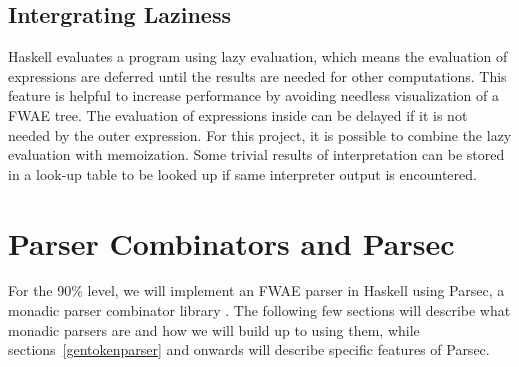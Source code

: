 \documentclass[format=acmlarge, review=false, nonacm=false, screen=true]{acmart}
\begin{document}
\subsection{Intergrating Laziness}
Haskell evaluates a program using lazy evaluation, which means the evaluation of expressions are deferred until the results are needed for other computations. This feature is helpful to increase performance by avoiding needless visualization of a FWAE tree. The evaluation of expressions inside can be delayed if it is not needed by the outer expression. For this project, it is possible to combine the lazy evaluation with memoization. Some trivial results of interpretation can be stored in a look-up table to be looked up if same interpreter output is encountered.

\section{Parser Combinators and Parsec}
For the 90\% level, we will implement an FWAE parser in Haskell using Parsec, a monadic parser combinator library \cite{parsec}. The following few sections will describe what monadic parsers are and how we will build up to using them, while sections~\ref{gentokenparser} and onwards will describe specific features of Parsec.
\end{document}
